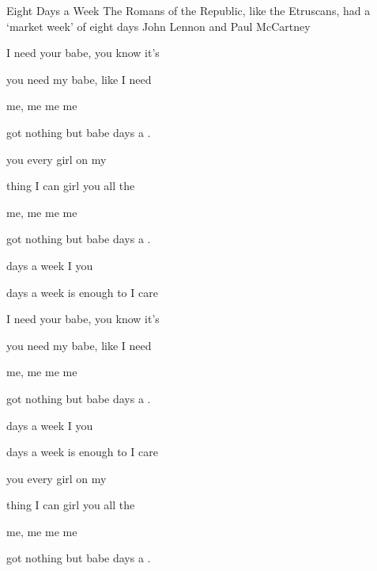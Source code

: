 \begin{SBSong}{Eight Days a Week}
  {The Romans of the Republic, like the Etruscans, had a `market week' of eight days}
  {John Lennon and Paul McCartney}
  \begin{SBVerse}
	 I need your  babe,  you know it's 
	
	 you need my  babe,  like I need 
	
	 me,  me  me  me
	
	 got nothing but  babe  days a .
  \end{SBVerse}
  \begin{SBVerse}
	 you every  girl  on my 
	
	 thing I can  girl  you all the 
	
	 me,  me  me  me
	
	 got nothing but  babe  days a .

	 days a week I  you
	
	 days a week is  enough to  I care
  \end{SBVerse}
  \begin{SBVerse}
	 I need your  babe,  you know it's 
	
	 you need my  babe,  like I need 
	
	 me,  me  me  me
	
	 got nothing but  babe  days a .

	 days a week I  you
	
	 days a week is  enough to  I care
  \end{SBVerse}
  \begin{SBVerse}
	 you every  girl  on my 
	
	 thing I can  girl  you all the 
	
	 me,  me  me  me
	
	 got nothing but  babe  days a .
  \end{SBVerse}
\end{SBSong}


